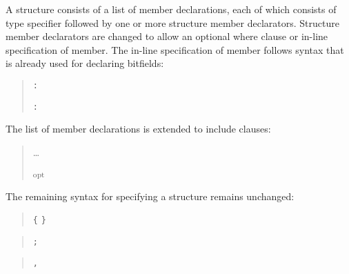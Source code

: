 A structure consists of a list of member declarations, each of which
consists of type specifier followed by one or more structure member
declarators. Structure member declarators are changed to allow an
optional where clause or in-line specification of member. The in-line
specification of member follows syntax that is already used for
declaring bitfields:


\begin{quote}

 \texttt{:}

 \texttt{:} 
\end{quote}

The list of member declarations is extended to include 
clauses:


\begin{quote}
\ldots{}

\textsubscript{opt}
\end{quote}

The remaining syntax for specifying a structure remains unchanged:


\begin{quote}
 \texttt{\{}
 \texttt{\}}
\end{quote}


\begin{quote}

\end{quote}


\begin{quote}
 \texttt{;}
\end{quote}


\begin{quote}

 \texttt{,} 
\end{quote}

